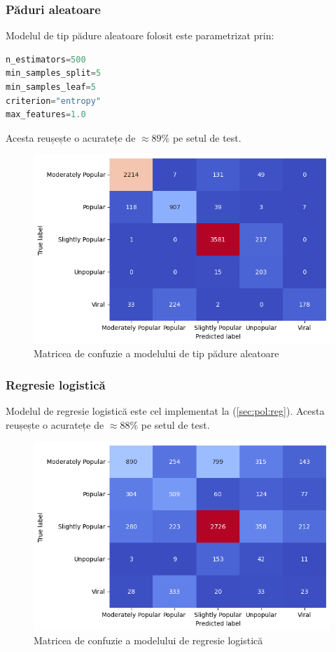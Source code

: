 \documentclass{article}
\begin{document}
\subsubsection{Păduri aleatoare}
Modelul de tip pădure aleatoare folosit este parametrizat prin:
\begin{lstlisting}[language=Python]
n_estimators=500
min_samples_split=5
min_samples_leaf=5
criterion="entropy"
max_features=1.0
\end{lstlisting}

Acesta reușește o acuratețe de $\approx 89\%$ pe setul de test.

\begin{figure}
    \centering
    \includegraphics[scale=0.5]{news_popularity/learning/random_forest_conf.png}
    \caption{Matricea de confuzie a modelului de tip pădure aleatoare}
    \label{fig:news:rf_conf}
\end{figure}

\subsubsection{Regresie logistică}
Modelul de regresie logistică este cel implementat la 
(\ref{sec:pol:reg}). Acesta reușește o acuratețe de $\approx 88\%$ pe setul
de test.

\begin{figure}[htb]
    \centering
    \includegraphics[scale=0.5]{news_popularity/learning/logistic_conf.png}
    \caption{Matricea de confuzie a modelului de regresie logistică}
    \label{fig:news:log_conf}
\end{figure}
\end{document}
